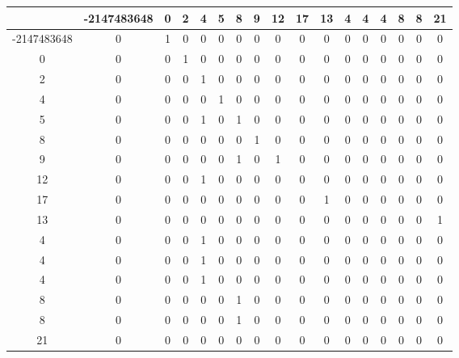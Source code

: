 \documentclass[landscape]{article}
\begin{document}

\clearpage

\begin{tabular}{c|c|c|c|c|c|c|c|c|c|c|c|c|c|c|c|c}
 & -2147483648 & 0 & 2 & 4 & 5 & 8 & 9 & 12 & 17 & 13 & 4 & 4 & 4 & 8 & 8 & 21 \\
\hline
-2147483648 & 0 & 1 & 0 & 0 & 0 & 0 & 0 & 0 & 0 & 0 & 0 & 0 & 0 & 0 & 0 & 0 \\
0 & 0 & 0 & 1 & 0 & 0 & 0 & 0 & 0 & 0 & 0 & 0 & 0 & 0 & 0 & 0 & 0 \\
2 & 0 & 0 & 0 & 1 & 0 & 0 & 0 & 0 & 0 & 0 & 0 & 0 & 0 & 0 & 0 & 0 \\
4 & 0 & 0 & 0 & 0 & 1 & 0 & 0 & 0 & 0 & 0 & 0 & 0 & 0 & 0 & 0 & 0 \\
5 & 0 & 0 & 0 & 1 & 0 & 1 & 0 & 0 & 0 & 0 & 0 & 0 & 0 & 0 & 0 & 0 \\
8 & 0 & 0 & 0 & 0 & 0 & 0 & 1 & 0 & 0 & 0 & 0 & 0 & 0 & 0 & 0 & 0 \\
9 & 0 & 0 & 0 & 0 & 0 & 1 & 0 & 1 & 0 & 0 & 0 & 0 & 0 & 0 & 0 & 0 \\
12 & 0 & 0 & 0 & 1 & 0 & 0 & 0 & 0 & 0 & 0 & 0 & 0 & 0 & 0 & 0 & 0 \\
17 & 0 & 0 & 0 & 0 & 0 & 0 & 0 & 0 & 0 & 1 & 0 & 0 & 0 & 0 & 0 & 0 \\
13 & 0 & 0 & 0 & 0 & 0 & 0 & 0 & 0 & 0 & 0 & 0 & 0 & 0 & 0 & 0 & 1 \\
4 & 0 & 0 & 0 & 1 & 0 & 0 & 0 & 0 & 0 & 0 & 0 & 0 & 0 & 0 & 0 & 0 \\
4 & 0 & 0 & 0 & 1 & 0 & 0 & 0 & 0 & 0 & 0 & 0 & 0 & 0 & 0 & 0 & 0 \\
4 & 0 & 0 & 0 & 1 & 0 & 0 & 0 & 0 & 0 & 0 & 0 & 0 & 0 & 0 & 0 & 0 \\
8 & 0 & 0 & 0 & 0 & 0 & 1 & 0 & 0 & 0 & 0 & 0 & 0 & 0 & 0 & 0 & 0 \\
8 & 0 & 0 & 0 & 0 & 0 & 1 & 0 & 0 & 0 & 0 & 0 & 0 & 0 & 0 & 0 & 0 \\
21 & 0 & 0 & 0 & 0 & 0 & 0 & 0 & 0 & 0 & 0 & 0 & 0 & 0 & 0 & 0 & 0 \\
\end{tabular}
\end{document}
